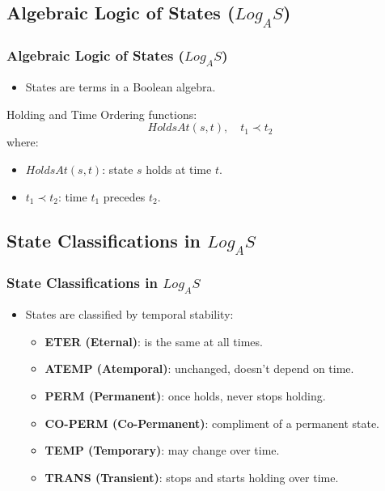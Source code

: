 \documentclass[aspectratio=169]{beamer}
\begin{document}
\subsection{Algebraic Logic of States ($Log_AS$)}
\begin{frame}
\frametitle{Algebraic Logic of States ($Log_AS$)}
\Large 
\begin{itemize}
    \item States are terms in a Boolean algebra.
\end{itemize}
\begin{block}{Holding and Time Ordering functions:}
\[
HoldsAt(s, t), \quad t_1 \prec t_2
\]
\normalsize where:
\begin{itemize}
    \item $HoldsAt(s, t)$: state $s$ holds at time $t$.
    \item $t_1 \prec t_2$: time $t_1$ precedes $t_2$.
\end{itemize}
\end{block}
\end{frame}

\subsection{State Classifications in $Log_AS$}
\begin{frame}
\frametitle{State Classifications in $Log_AS$}
\Large
\begin{itemize}
    \item States are classified by temporal stability:
    \begin{itemize}
        \Large 
        \item \textbf{ETER (Eternal)}: is the same at all times.
        \item \textbf{ATEMP (Atemporal)}: unchanged, doesn't depend on time.
        \item \textbf{PERM (Permanent)}: once holds, never stops holding.
        \item \textbf{CO-PERM (Co-Permanent)}: compliment of a permanent state.
        \item \textbf{TEMP (Temporary)}: may change over time.
        \item \textbf{TRANS (Transient)}: stops and starts holding over time.
    \end{itemize}
\end{itemize}
\end{frame}

\end{document}
